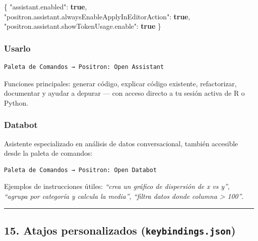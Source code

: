 \documentclass[
  doc,
  floatsintext,
  longtable,
  a4paper,
  nolmodern,
  notxfonts,
  notimes,
  12pt,
  colorlinks=true,linkcolor=blue,citecolor=blue,urlcolor=blue]{apa7}
\newenvironment{Shaded}{\begin{snugshade}}{\end{snugshade}}
\newcommand{\DataTypeTok}[1]{\textcolor[rgb]{0.68,0.00,0.00}{#1}}
\newcommand{\FunctionTok}[1]{\textcolor[rgb]{0.28,0.35,0.67}{#1}}
\newcommand{\KeywordTok}[1]{\textcolor[rgb]{0.00,0.23,0.31}{\textbf{#1}}}
\begin{document}
\begin{Shaded}
\begin{Highlighting}[]
\FunctionTok{\{}
  \DataTypeTok{"assistant.enabled"}\FunctionTok{:} \KeywordTok{true}\FunctionTok{,}
  \DataTypeTok{"positron.assistant.alwaysEnableApplyInEditorAction"}\FunctionTok{:} \KeywordTok{true}\FunctionTok{,}
  \DataTypeTok{"positron.assistant.showTokenUsage.enable"}\FunctionTok{:} \KeywordTok{true}
\FunctionTok{\}}
\end{Highlighting}
\end{Shaded}

\subsubsection{Usarlo}\label{usarlo}

\begin{verbatim}
Paleta de Comandos → Positron: Open Assistant
\end{verbatim}

Funciones principales: generar código, explicar código existente,
refactorizar, documentar y ayudar a depurar --- con acceso directo a tu
sesión activa de R o Python.

\subsubsection{Databot}\label{databot}

Asistente especializado en análisis de datos conversacional, también
accesible desde la paleta de comandos:

\begin{verbatim}
Paleta de Comandos → Positron: Open Databot
\end{verbatim}

Ejemplos de instrucciones útiles: \emph{``crea un gráfico de dispersión
de x vs y''}, \emph{``agrupa por categoría y calcula la media''},
\emph{``filtra datos donde columna \textgreater{} 100''}.

\begin{center}\rule{0.5\linewidth}{0.5pt}\end{center}

\subsection{\texorpdfstring{15. Atajos personalizados
(\texttt{keybindings.json})}{15. Atajos personalizados (keybindings.json)}}\label{atajos-personalizados-keybindings.json}
\end{document}
